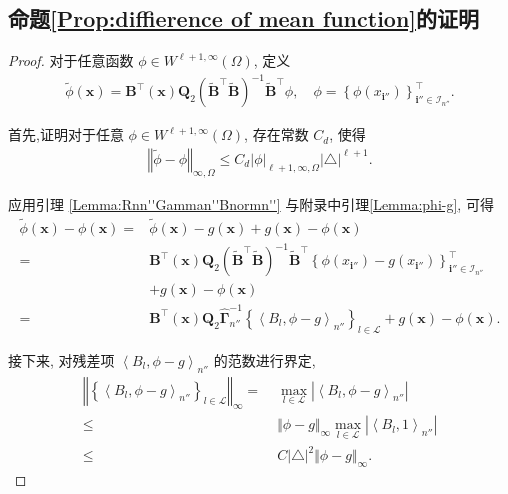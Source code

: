 \documentclass[a4paper,openay,14pt]{ctexbook}
\numberwithin{equation}{section}
\numberwithin{lem}{section}
\begin{document}
\subsection{命题\ref{Prop:diffierence of mean function}的证明}
\begin{proof}
    对于任意函数 $\phi \in W^{\ell+1,\infty}(\Omega)$, 定义  
\begin{align*}
\tilde{\phi}(\boldsymbol{x}) 
= \mathbf{B}^{\top}(\boldsymbol{x})
\mathbf{Q}_2
\left(\tilde{\mathbf{B}}^{\top}\tilde{\mathbf{B}}\right)^{-1}
\tilde{\mathbf{B}}^{\top}\phi, 
\quad 
\phi = \left\{\phi(x_{\mathbf{i}''})\right\}^{\top}_{\mathbf{i}''\in\mathcal{I}_{n''}}.
\end{align*}

首先,证明对于任意 $\phi\in W^{\ell+1,\infty}(\Omega)$, 存在常数 $C_d$, 使得
\begin{align}\label{inequ:tildephi}
\left\Vert \tilde\phi - \phi\right\Vert_{\infty,\Omega} 
\leq 
C_d 
\vert\phi\vert_{\ell+1,\infty,\Omega}
\vert \triangle\vert^{\ell+1}.  
\end{align}

应用引理 \ref{Lemma:Rnn''Gamman''Bnormn''} 与附录中引理\ref{Lemma:phi-g}, 可得
\begin{align*}
\tilde{\phi}(\boldsymbol{x}) - \phi(\boldsymbol{x}) 
=& \tilde{\phi}(\boldsymbol{x}) - g(\boldsymbol{x}) 
+ g(\boldsymbol{x})-\phi(\boldsymbol{x})\\
=&
\mathbf{B}^{\top}(\boldsymbol{x})
\mathbf{Q}_2
\left(\tilde{\mathbf{B}}^{\top}\tilde{\mathbf{B}}\right)^{-1}
\tilde{\mathbf{B}}^{\top}
\left\{\phi(x_{\mathbf{i}''}) - g(x_{\mathbf{i}''})\right\}^{\top}_{\mathbf{i}''\in\mathcal{I}_{n''}} 
\\
&+ g(\boldsymbol{x}) - \phi(\boldsymbol{x})\\
=&
\mathbf{B}^{\top}(\boldsymbol{x})
\mathbf{Q}_2
\hat{\boldsymbol{\Gamma}}^{-1}_{n''}
\left\{\left\langle B_l,\phi-g\right\rangle_{n''}\right\}_{l\in\mathcal{L}} 
+ g(\boldsymbol{x}) - \phi(\boldsymbol{x}).
\end{align*}

接下来, 对残差项 $\left\langle B_l, \phi - g \right\rangle_{n''}$ 的范数进行界定,
\begin{align*}
\left\Vert
\left\{
\left\langle B_l,\phi-g\right\rangle_{n''}
\right\}_{l\in\mathcal{L}}
\right\Vert_{\infty} 
=&\; 
\max_{l\in\mathcal{L}}
\left\vert
\left< B_l,\phi-g\right>_{n''}
\right\vert\\
\leq &\; 
\Vert \phi-g\Vert_{\infty}
\max_{l\in\mathcal{L}}
\left\vert
\left<B_l,1\right>_{n''}
\right\vert\\
\leq &\; 
C\vert\triangle\vert^2
\Vert \phi-g\Vert_{\infty}.
\end{align*}


\end{proof}
\end{document}
